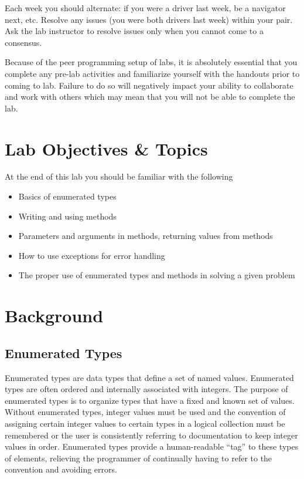 \documentclass[12pt]{scrartcl}
\begin{document}
Each week you should alternate: if you were a driver last week, 
be a navigator next, etc.  Resolve any issues (you were both drivers
last week) within your pair.  Ask the lab instructor to resolve issues
only when you cannot come to a consensus.  

Because of the peer programming setup of labs, it is absolutely 
essential that you complete any pre-lab activities and familiarize
yourself with the handouts prior to coming to lab.  Failure to do
so will negatively impact your ability to collaborate and work with 
others which may mean that you will not be able to complete the
lab.  

\section{Lab Objectives \& Topics}
At the end of this lab you should be familiar with the following
\begin{itemize}
  \item Basics of enumerated types
  \item Writing and using methods
  \item Parameters and arguments in methods, returning values from methods
  \item How to use exceptions for error handling
  \item The proper use of enumerated types and methods in solving a given problem
\end{itemize}

\section{Background}

\subsection*{Enumerated Types}

Enumerated types are data types that define a set of named values.  Enumerated 
types are often ordered and internally associated with integers.  The purpose of 
enumerated types is to organize types that have a fixed and known set of values.  
Without enumerated types, integer values must be used and the convention of 
assigning certain integer values to certain types in a logical collection must be 
remembered or the user is consistently referring to documentation to keep 
integer values in order.  Enumerated types provide a human-readable ``tag''
to these types of elements, relieving the programmer of continually having to 
refer to the convention and avoiding errors.
\end{document}
